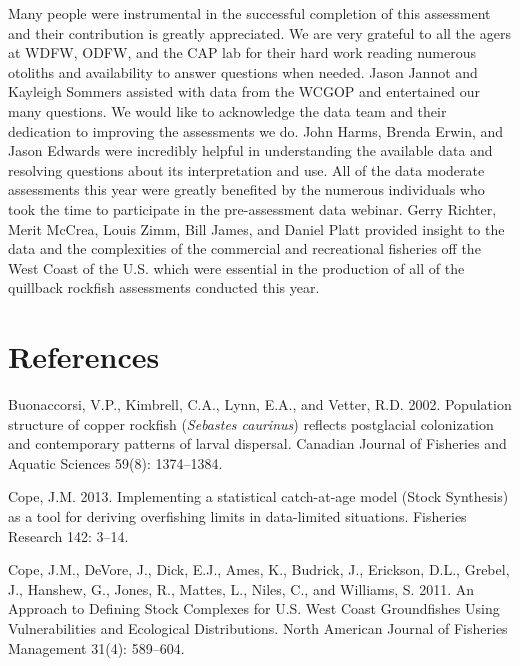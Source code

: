 \documentclass[11pt,
  english,
  letterpaper,
]{article}
\begin{document}
Many people were instrumental in the successful completion of this assessment and their contribution is greatly appreciated. We are very grateful to all the agers at WDFW, ODFW, and the CAP lab for their hard work reading numerous otoliths and availability to answer questions when needed. Jason Jannot and Kayleigh Sommers assisted with data from the WCGOP and entertained our many questions. We would like to acknowledge the data team and their dedication to improving the assessments we do. John Harms, Brenda Erwin, and Jason Edwards were incredibly helpful in understanding the available data and resolving questions about its interpretation and use. All of the data moderate assessments this year were greatly benefited by the numerous individuals who took the time to participate in the pre-assessment data webinar. Gerry Richter, Merit McCrea, Louis Zimm, Bill James, and Daniel Platt provided insight to the data and the complexities of the commercial and recreational fisheries off the West Coast of the U.S. which were essential in the production of all of the quillback rockfish assessments conducted this year.

\leavevmode\tagmcend\tagstructend\par

\clearpage


\hypertarget{references}{%
\section{References}\label{references}}

\leavevmode\tagmcend\tagstructend


\hypertarget{refs}{}
\leavevmode\hypertarget{ref-buonaccorsi_population_2002}{}%
Buonaccorsi, V.P., Kimbrell, C.A., Lynn, E.A., and Vetter, R.D. 2002. Population structure of copper rockfish (\emph{Sebastes caurinus}) reflects postglacial colonization and contemporary patterns of larval dispersal. Canadian Journal of Fisheries and Aquatic Sciences 59(8): 1374--1384.

\leavevmode\hypertarget{ref-cope_implementing_2013}{}%
Cope, J.M. 2013. Implementing a statistical catch-at-age model (Stock Synthesis) as a tool for deriving overfishing limits in data-limited situations. Fisheries Research 142: 3--14.

\leavevmode\hypertarget{ref-cope_approach_2011}{}%
Cope, J.M., DeVore, J., Dick, E.J., Ames, K., Budrick, J., Erickson, D.L., Grebel, J., Hanshew, G., Jones, R., Mattes, L., Niles, C., and Williams, S. 2011. An Approach to Defining Stock Complexes for U.S. West Coast Groundfishes Using Vulnerabilities and Ecological Distributions. North American Journal of Fisheries Management 31(4): 589--604.
\end{document}
